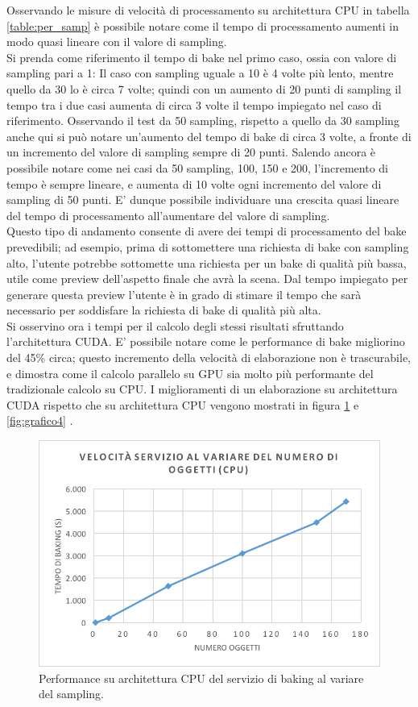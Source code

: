 Osservando le misure di velocità di processamento su architettura CPU in tabella \ref{table:per_samp} è possibile notare come il tempo di processamento aumenti in modo quasi lineare con il valore di sampling.
\\
Si prenda come riferimento il tempo di bake nel primo caso, ossia con valore di sampling pari a 1:
Il caso con sampling uguale a 10 è 4 volte più lento, mentre quello da 30 lo è circa 7 volte; quindi con un aumento di 20 punti di sampling il tempo tra i due casi aumenta di circa 3 volte il tempo impiegato nel caso di riferimento. Osservando il test da 50 sampling, rispetto a quello da 30 sampling anche qui si può notare un’aumento del tempo di bake di circa 3 volte, a fronte di un incremento del valore di sampling sempre di 20 punti. Salendo ancora è possibile notare come nei casi da 50 sampling, 100, 150 e 200, l’incremento di tempo è sempre lineare, e aumenta di 10 volte ogni incremento del valore di sampling di 50 punti. E’ dunque possibile individuare una crescita quasi lineare del tempo di processamento all’aumentare del valore di sampling.
\\ 
Questo tipo di andamento consente di avere dei tempi di processamento del bake prevedibili; ad esempio, prima di sottomettere una richiesta di bake con sampling alto, l’utente potrebbe sottomette una richiesta per un bake di qualità più bassa, utile come preview dell’aspetto finale che avrà la scena. Dal tempo impiegato per generare questa preview l’utente è in grado di stimare il tempo che sarà necessario per soddisfare la richiesta di bake di qualità più alta. 
\\
Si osservino ora i tempi per il calcolo degli stessi risultati sfruttando l’architettura CUDA. E’ possibile notare come le performance di bake migliorino del 45\% circa; questo incremento della velocità di elaborazione non è trascurabile, e dimostra come il calcolo parallelo su GPU sia molto più performante del tradizionale calcolo su CPU. I miglioramenti di un elaborazione su architettura CUDA rispetto che su architettura CPU vengono mostrati in figura \ref{fig:grafico3} e \ref{fig:grafico4} .
\\
\begin{figure}[htb]
 \centering
 \includegraphics[width=0.8\linewidth]{images/chapter_prove_sperimentali/grafico1.png}\hfill
 \caption[Performance CPU variando sampling]{Performance su architettura CPU del servizio di baking al variare del sampling.}
 \label{fig:grafico3}
\end{figure}
